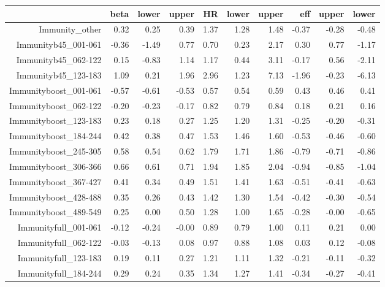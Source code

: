 \begin{table}[ht]
\centering
\begin{tabular}{rrrrrrrrrr}
  \hline
 & beta & lower & upper & HR & lower & upper & eff & upper & lower \\ 
  \hline
Immunity\_other & 0.32 & 0.25 & 0.39 & 1.37 & 1.28 & 1.48 & -0.37 & -0.28 & -0.48 \\ 
  Immunityb45\_001-061 & -0.36 & -1.49 & 0.77 & 0.70 & 0.23 & 2.17 & 0.30 & 0.77 & -1.17 \\ 
  Immunityb45\_062-122 & 0.15 & -0.83 & 1.14 & 1.17 & 0.44 & 3.11 & -0.17 & 0.56 & -2.11 \\ 
  Immunityb45\_123-183 & 1.09 & 0.21 & 1.96 & 2.96 & 1.23 & 7.13 & -1.96 & -0.23 & -6.13 \\ 
  Immunityboost\_001-061 & -0.57 & -0.61 & -0.53 & 0.57 & 0.54 & 0.59 & 0.43 & 0.46 & 0.41 \\ 
  Immunityboost\_062-122 & -0.20 & -0.23 & -0.17 & 0.82 & 0.79 & 0.84 & 0.18 & 0.21 & 0.16 \\ 
  Immunityboost\_123-183 & 0.23 & 0.18 & 0.27 & 1.25 & 1.20 & 1.31 & -0.25 & -0.20 & -0.31 \\ 
  Immunityboost\_184-244 & 0.42 & 0.38 & 0.47 & 1.53 & 1.46 & 1.60 & -0.53 & -0.46 & -0.60 \\ 
  Immunityboost\_245-305 & 0.58 & 0.54 & 0.62 & 1.79 & 1.71 & 1.86 & -0.79 & -0.71 & -0.86 \\ 
  Immunityboost\_306-366 & 0.66 & 0.61 & 0.71 & 1.94 & 1.85 & 2.04 & -0.94 & -0.85 & -1.04 \\ 
  Immunityboost\_367-427 & 0.41 & 0.34 & 0.49 & 1.51 & 1.41 & 1.63 & -0.51 & -0.41 & -0.63 \\ 
  Immunityboost\_428-488 & 0.35 & 0.26 & 0.43 & 1.42 & 1.30 & 1.54 & -0.42 & -0.30 & -0.54 \\ 
  Immunityboost\_489-549 & 0.25 & 0.00 & 0.50 & 1.28 & 1.00 & 1.65 & -0.28 & -0.00 & -0.65 \\ 
  Immunityfull\_001-061 & -0.12 & -0.24 & -0.00 & 0.89 & 0.79 & 1.00 & 0.11 & 0.21 & 0.00 \\ 
  Immunityfull\_062-122 & -0.03 & -0.13 & 0.08 & 0.97 & 0.88 & 1.08 & 0.03 & 0.12 & -0.08 \\ 
  Immunityfull\_123-183 & 0.19 & 0.11 & 0.27 & 1.21 & 1.11 & 1.32 & -0.21 & -0.11 & -0.32 \\ 
  Immunityfull\_184-244 & 0.29 & 0.24 & 0.35 & 1.34 & 1.27 & 1.41 & -0.34 & -0.27 & -0.41 \\ 

\end{tabular}
\end{table}
